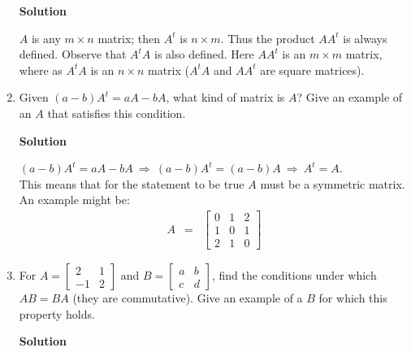 \begin{enumerate}
\noindent \textbf{Solution}

\noindent $A$ is any $m \times n$ matrix; then $A^{t}$ is $n
\times m$. Thus the product $AA^{t}$ is always defined. Observe
that $A^{t}A$ is also defined. Here $AA^{t}$ is an $m \times m$
matrix, where as $A^{t}A$ is an $n \times n$ matrix ($A^{t}A$ and
$AA^{t}$ are square matrices).

\item Given $(a-b)A^t=aA-bA$, what kind of matrix is $A$? Give an
example of an $A$ that satisfies this condition.

\noindent \textbf{Solution}

\noindent $(a-b)A^t=aA-bA\ \Rightarrow\ (a-b)A^t=(a-b)A\
\Rightarrow\ A^{t}=A$.\\ This means that for the statement to be
true $A$ must be a symmetric matrix. An example might be:
\begin{eqnarray*}
A &=& \left[ \begin{array}{rrr}
                           0&1&2\\
                           1&0&1\\
                           2&1&0\end{array} \right]
\end{eqnarray*}
\item For $A=\left [ \begin{array}{rr} 2&1\\-1&2 \end{array} \right ]$ and
$B=\left [ \begin{array}{rr} a&b\\c&d \end{array} \right ]$, find
the conditions under which $AB=BA$ (they are commutative). Give an
example of a $B$ for which this property holds.

\noindent \textbf{Solution}


\end{enumerate}
